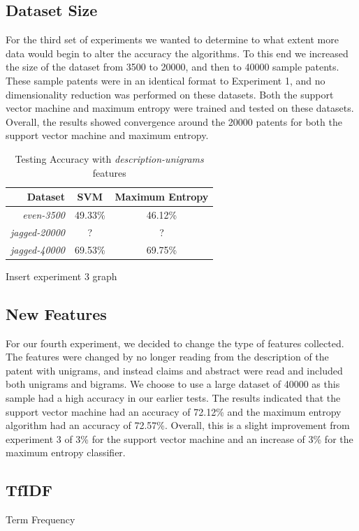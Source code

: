 \subsection{Dataset Size}
For the third set of experiments we wanted to determine to what extent more data would begin to alter the accuracy the algorithms.  To this end we increased the size of the dataset from 3500 to 20000, and then to 40000 sample patents.  These sample patents were in an identical format to Experiment 1, and no dimensionality reduction was performed on these datasets.  Both the support vector machine and maximum entropy were trained and tested on these datasets.  Overall, the results showed convergence around the 20000 patents for both the support vector machine and maximum entropy.


\begin{table}[Ht]
\caption{Testing Accuracy with \emph{description-unigrams} features}
\centering
\begin{tabular}{| r | c | c |}
\hline
Dataset & SVM & Maximum Entropy \\ \hline
\emph{even-3500} & 49.33\% & 46.12\% \\ \hline
\emph{jagged-20000} & ? & ? \\ \hline
\emph{jagged-40000} & 69.53\% & 69.75\% \\ \hline
\end{tabular}
\end{table}


Insert experiment 3 graph



\subsection{New Features}
For our fourth experiment, we decided to change the type of features collected.  The features were changed by no longer reading from the description of the patent with unigrams, and instead claims and abstract were read and included both unigrams and bigrams. We choose to use a large dataset of 40000 as this sample had a high accuracy in our earlier tests.  The results indicated that the support vector machine had an accuracy of 72.12\% and the maximum entropy algorithm had an accuracy of 72.57\%.  Overall, this is a slight improvement from experiment 3 of 3\% for the support vector machine and an increase of 3\% for the maximum entropy classifier.

\subsection{TfIDF}
Term Frequency
